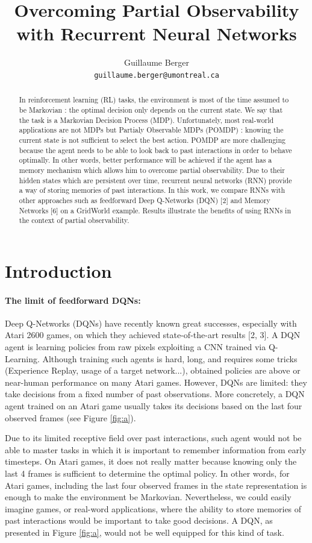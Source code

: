 \documentclass{article} %
\title{Overcoming Partial Observability with Recurrent Neural Networks}
\author{Guillaume Berger \\
	\texttt{guillaume.berger@umontreal.ca}\\
}
\begin{document}
	
	\maketitle
	
	
	\begin{abstract}
		In reinforcement learning (RL) tasks, the environment is most of the time assumed to be Markovian : the optimal decision only depends on the current state. We say that the task is a Markovian Decision Process (MDP). Unfortunately, most real-world applications are not MDPs but Partialy Observable MDPs (POMDP) : knowing the current state is not sufficient to select the best action. POMDP are more challenging because the agent needs to be able to look back to past interactions in order to behave optimally. In other words, better performance will be achieved if the agent has a memory mechanism which allows him to overcome partial observability. Due to their hidden states which are persistent over time, recurrent neural networks (RNN) provide a way of storing memories of past interactions. In this work, we compare RNNs with other approaches such as feedforward Deep Q-Networks (DQN) [2] and Memory Networks [6] on a GridWorld example. Results illustrate the benefits of using RNNs in the context of partial observability.
	\end{abstract}
	
	
	\section{Introduction}
	
	
	\paragraph{The limit of feedforward DQNs:} Deep Q-Networks (DQNs) have recently known great successes, especially with Atari 2600 games, on which they achieved state-of-the-art results [2, 3]. A DQN agent is learning policies from raw pixels exploiting a CNN trained via Q-Learning. Although training such agents is hard, long, and requires some tricks (Experience Replay, usage of a target network...), obtained policies are above or near-human performance on many Atari games. However, DQNs are limited: they take decisions from a fixed number of past observations. More concretely, a DQN agent trained on an Atari game usually takes its decisions based on the last four observed frames (see Figure \ref{fig:a}).
		
	
	Due to its limited receptive field over past interactions, such agent would not be able to master tasks in which it is important to remember information from early timesteps. On Atari games, it does not really matter because knowing only the last 4 frames is sufficient to determine the optimal policy. In other words, for Atari games, including the last four observed frames in the state representation is enough to make the environment be Markovian. Nevertheless, we could easily imagine games, or real-word applications, where the ability to store memories of past interactions would be important to take good decisions. A DQN, as presented in Figure \ref{fig:a}, would not be well equipped for this kind of task.
	
\end{document}
